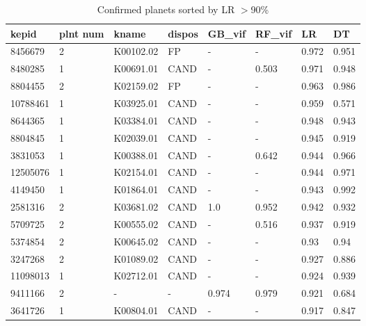 \begin{longtable}[!htbp]
{| 
 p{}| 
 p{}| 
 p{}| 
 p{}| 
 p{}| 
 p{}| 
 p{}| 
 p{}| 
}
\caption{Confirmed planets sorted by LR $>$90\%}\\    %
\hline
\textbf{kepid} &\textbf{plnt num} &\textbf{kname} &\textbf{dispos} &\textbf{GB\_vif} &\textbf{RF\_vif} &\textbf{LR} &\textbf{DT} \\ \hline 
8456679 &2 &K00102.02 &FP &- &- &0.972 &0.951 \\ \hline 
8480285 &1 &K00691.01 &CAND &- &0.503 &0.971 &0.948 \\ \hline 
8804455 &2 &K02159.02 &FP &- &- &0.963 &0.986 \\ \hline 
10788461 &1 &K03925.01 &CAND &- &- &0.959 &0.571 \\ \hline 
8644365 &1 &K03384.01 &CAND &- &- &0.948 &0.943 \\ \hline 
8804845 &1 &K02039.01 &CAND &- &- &0.945 &0.919 \\ \hline 
3831053 &1 &K00388.01 &CAND &- &0.642 &0.944 &0.966 \\ \hline 
12505076 &1 &K02154.01 &CAND &- &- &0.944 &0.971 \\ \hline 
4149450 &1 &K01864.01 &CAND &- &- &0.943 &0.992 \\ \hline 
2581316 &2 &K03681.02 &CAND &1.0 &0.952 &0.942 &0.932 \\ \hline 
5709725 &2 &K00555.02 &CAND &- &0.516 &0.937 &0.919 \\ \hline 
5374854 &2 &K00645.02 &CAND &- &- &0.93 &0.94 \\ \hline 
3247268 &2 &K01089.02 &CAND &- &- &0.927 &0.886 \\ \hline 
11098013 &1 &K02712.01 &CAND &- &- &0.924 &0.939 \\ \hline 
9411166 &2 &- &- &0.974 &0.979 &0.921 &0.684 \\ \hline 
3641726 &1 &K00804.01 &CAND &- &- &0.917 &0.847 \\ \hline 

\end{longtable}
